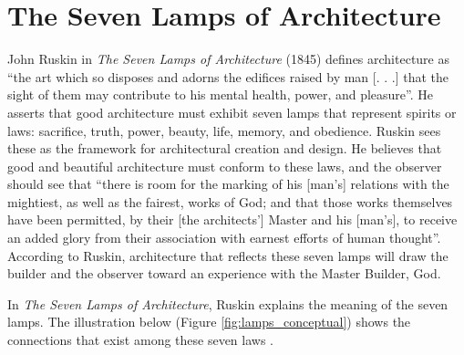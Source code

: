 \section{The Seven Lamps of Architecture}

John Ruskin in \textit{The Seven Lamps of Architecture} (1845) defines
architecture as ``the art which so disposes and adorns the edifices
raised by man [. . .] that the sight of them may contribute to his
mental health, power, and pleasure''\citep[][pg. 8]{ruskin1920}.  He asserts that
good architecture must exhibit seven lamps that represent spirits or
laws: sacrifice, truth, power, beauty, life, memory, and obedience. 
Ruskin sees these as the framework for architectural creation and
design.  He believes that good and beautiful architecture must conform
to these laws, and the observer should see that ``there is room for the
marking of his [man’s] relations with the mightiest, as well as the
fairest, works of God; and that those works themselves have been
permitted, by their [the architects’] Master and his [man’s], to
receive an added glory from their association with earnest efforts of
human thought''\citep[][pg. 73]{ruskin1920}.  According to Ruskin, architecture that reflects
these seven lamps will draw the builder and the observer toward an
experience with the Master Builder, God.  

In \textit{The Seven Lamps of Architecture}, Ruskin explains the
meaning of the seven lamps.  The illustration below (Figure \ref{fig:lamps_conceptual}) shows the
connections that exist among these seven laws \citep[][pg. 402]{baljon1997}.

